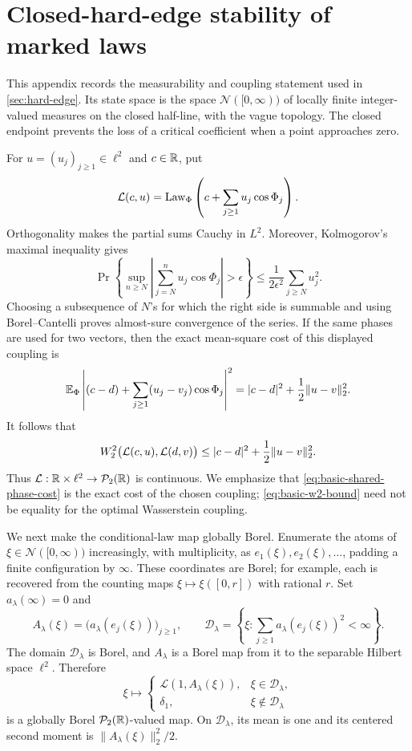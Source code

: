 \section{Closed-hard-edge stability of marked laws}
\label{app:marked-laws}

This appendix records the measurability and coupling statement used in
\cref{sec:hard-edge}.  Its state space is the space
\(\mathcal N([0,\infty))\) of locally finite integer-valued measures on the
closed half-line, with the vague topology.  The closed endpoint prevents the
loss of a critical coefficient when a point approaches zero.

For \(u=(u_j)_{j\ge1}\in\ell^2\) and \(c\in\mathbb R\), put
\[
 \mathcal L(c,u)
 =\operatorname{Law}_\Phi\left(c+\sum_{j\ge1}u_j\cos\Phi_j\right).
\]
Orthogonality makes the partial sums Cauchy in \(L^2\).  Moreover,
Kolmogorov's maximal inequality gives
\[
 \Pr\left\{\sup_{n\ge N}\left|\sum_{j=N}^n
 u_j\cos\Phi_j\right|>\epsilon\right\}
 \le\frac1{2\epsilon^2}\sum_{j\ge N}u_j^2.
\]
Choosing a subsequence of \(N\)'s for which the right side is summable and
using Borel--Cantelli proves almost-sure convergence of the series.  If the
same phases are
used for two vectors, then the exact mean-square cost of this displayed
coupling is
\begin{equation}
 \mathbb E_\Phi\left|
 (c-d)+\sum_{j\ge1}(u_j-v_j)\cos\Phi_j\right|^2
 =|c-d|^2+\frac12\|u-v\|_2^2.
 \label{eq:basic-shared-phase-cost}
\end{equation}
It follows that
\begin{equation}
 W_2^2\bigl(\mathcal L(c,u),\mathcal L(d,v)\bigr)
 \le |c-d|^2+\frac12\|u-v\|_2^2.
 \label{eq:basic-w2-bound}
\end{equation}
Thus \(\mathcal L:\mathbb R\times\ell^2\to\mathcal P_2(\mathbb R)\) is continuous.  We emphasize
that \eqref{eq:basic-shared-phase-cost} is the exact cost of the chosen
coupling; \eqref{eq:basic-w2-bound} need not be equality for the optimal
Wasserstein coupling.

We next make the conditional-law map globally Borel.  Enumerate the atoms of
\(\xi\in\mathcal N([0,\infty))\) increasingly, with multiplicity, as
\(e_1(\xi),e_2(\xi),\ldots\), padding a finite configuration by
\(\infty\).  These coordinates are Borel; for example, each is recovered
from the counting maps \(\xi\mapsto\xi([0,r])\) with rational \(r\).  Set
\(a_\lambda(\infty)=0\) and
\[
 A_\lambda(\xi)=\bigl(a_\lambda(e_j(\xi))\bigr)_{j\ge1},
 \qquad
 \mathcal D_\lambda=
 \left\{\xi:\sum_{j\ge1}a_\lambda(e_j(\xi))^2<\infty\right\}.
\]
The domain \(\mathcal D_\lambda\) is Borel, and \(A_\lambda\) is a Borel
map from it to the separable Hilbert space \(\ell^2\).  Therefore
\begin{equation}
 \xi\longmapsto
 \begin{cases}
  \mathcal L(1,A_\lambda(\xi)),&\xi\in\mathcal D_\lambda,\\
  \delta_1,&\xi\notin\mathcal D_\lambda
 \end{cases}
 \label{eq:borel-conditional-law}
\end{equation}
is a globally Borel \(\mathcal P_2(\mathbb R)\)-valued map.  On \(\mathcal D_\lambda\), its
mean is one and its centered second moment is
\(\|A_\lambda(\xi)\|_2^2/2\).

